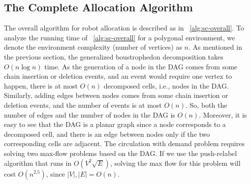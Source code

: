 \subsection{The Complete Allocation Algorithm}
The overall algorithm for robot allocation is described as in ~\ref{alg:sc-overall}.
To analyze the running time of ~\ref{alg:sc-overall} for a polygonal environment, 
we denote the environment complexity (number of vertices) as $n$. 
As mentioned in the previous section, the generalized boustrophedon decomposition takes $O(n\log n)$ time. 
As the generation of a node in the DAG comes from some chain insertion or deletion events, and an event would require one vertex to happen, 
there is at most $O(n)$ decomposed cells, i.e., nodes in the DAG. 
Similarly, adding edges between nodes comes from some chain insertion or deletion events, and the number of events is at most $O(n)$. 
So, both the number of edges and the number of nodes in the DAG is $O(n)$.
Moreover, it is easy to see that the DAG is a planar graph since a node corresponds to a decomposed cell, and there is an edge between nodes only if the two corresponding cells are adjacent.
The circulation with demand problem requires solving two max-flow problems based on the DAG. 
If we use the push-relabel algorithm \cite{cheriyan1989analysis} that runs in $O(V^2\sqrt{E})$, solving the max flow for this problem will cost $O(n^{2.5})$, 
since $|V|, |E| = O(n)$.%

